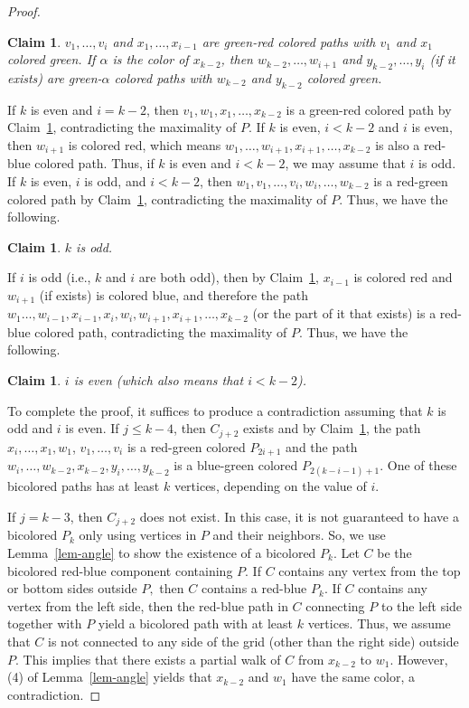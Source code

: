 \documentclass[
final, nomarks
]{dmtcs-episciences}
\newtheorem{claim}[theorem]{Claim}
\begin{document}
\begin{proof}
\begin{claim}\label{rem:nbrs}
$v_1,\dots,v_i$ and $x_1,\dots,x_{i-1}$ are green-red colored paths with $v_1$ and $x_1$ colored green. If $\alpha$ is the color of $x_{k-2}$, then $w_{k-2},\dots,w_{i+1}$ and $y_{k-2},\dots,y_i$ (if it exists) are green-$\alpha$ colored paths with $w_{k-2}$ and $y_{k-2}$ colored green. 
\end{claim} 
 

If $k$ is even and $i=k-2$, then $v_1,w_1,x_1,\dots,x_{k-2}$ is a green-red colored path by Claim~\ref{rem:nbrs}, contradicting the maximality of $P.$ If $k$ is even, $i<k-2$ and $i$ is even, then $w_{i+1}$ is colored red, which means $w_1,\dots,w_{i+1},x_{i+1},\dots,x_{k-2}$ is also a red-blue colored path. Thus, if $k$ is even and $i<k-2$, we may assume that $i$ is odd. If $k$ is even, $i$ is odd, and $i<k-2$, then $w_1,v_1,\dots,v_i,w_i,\dots,w_{k-2}$ is a red-green colored path by Claim~\ref{rem:nbrs}, contradicting the maximality of $P.$ Thus, we have the following. 
\begin{claim}\label{clm:k_odd}
$k$ is odd.
\end{claim}
If $i$ is odd (i.e., $k$ and $i$ are both odd), then by Claim~\ref{rem:nbrs}, $x_{i-1}$ is colored red and $w_{i+1}$ (if exists) is colored blue, and therefore the path $w_1\dots,w_{i-1},x_{i-1},x_i,w_i,w_{i+1},x_{i+1},\dots,x_{k-2}$ (or the part of it that exists) is a red-blue colored path, contradicting the maximality of $P.$ Thus, we have the following. 
\begin{claim}\label{clm:i_even}
    $i$ is even (which also means that $i<k-2$).
\end{claim}
To complete the proof, it suffices to produce a contradiction assuming that $k$ is odd and $i$ is even. 
If $j\leq k-4$, then $C_{j+2}$ exists and by Claim~\ref{rem:nbrs}, the path $x_i, \dots, x_1, w_1$, $v_1,\dots,v_i$ is a red-green colored $P_{2i+1}$ and 
the path $w_i, \dots, w_{k-2}, x_{k-2}, y_i, \dots, y_{k-2}$ 
is a blue-green colored $P_{2(k-i-1)+1}$. One of these bicolored paths has at least $k$ vertices, depending on the value of $i$.

If $j=k-3$, then $C_{j+2}$ does not exist. In this case, it is not guaranteed to have a bicolored $P_k$ only using vertices in $P$ and their neighbors.  So, we use Lemma~\ref{lem-angle} to show the existence of a bicolored $P_k$.  Let $C$ be the bicolored red-blue component containing $P.$ If $C$ contains any vertex from the top or bottom sides outside $P,$ then $C$ contains a red-blue $P_k.$ If $C$ contains any vertex from the left side, then the red-blue path in $C$ connecting $P$ to the left side together with $P$ yield a bicolored path with at least $k$ vertices. Thus, we assume that $C$ is not connected to any side of the grid (other than the right side) outside $P$. This implies that there exists a partial walk of $C$ from $x_{k-2}$ to $w_1$. However, (4) of Lemma~\ref{lem-angle} yields that $x_{k-2}$ and $w_1$ have the same color, a contradiction. 
\end{proof}
\end{document}
